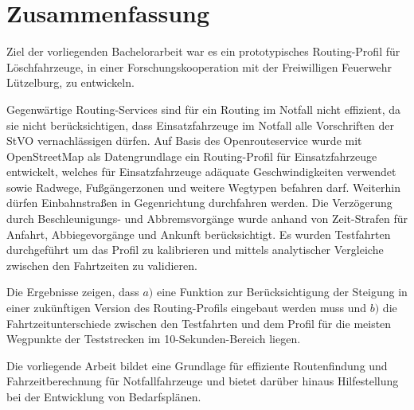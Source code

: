 {\centering\section*{Zusammenfassung}}

\vspace{1cm}

Ziel der vorliegenden Bachelorarbeit war es ein prototypisches Routing-Profil für Löschfahrzeuge, in einer Forschungskooperation mit der Freiwilligen Feuerwehr Lützelburg, zu entwickeln.
\medskip

Gegenwärtige Routing-Services sind für ein Routing im Notfall nicht effizient, da sie nicht berücksichtigen, dass Einsatzfahrzeuge im Notfall alle Vorschriften der StVO vernachlässigen dürfen.
Auf Basis des Openrouteservice wurde mit OpenStreetMap als Datengrundlage ein Routing-Profil für Einsatzfahrzeuge entwickelt, welches für Einsatzfahrzeuge adäquate Geschwindigkeiten verwendet sowie Radwege, Fußgängerzonen und weitere Wegtypen befahren darf. Weiterhin dürfen Einbahnstraßen in Gegenrichtung durchfahren werden.
Die Verzögerung durch Beschleunigungs- und Abbremsvorgänge wurde anhand von Zeit-Strafen für Anfahrt, Abbiegevorgänge und Ankunft berücksichtigt.
Es wurden Testfahrten durchgeführt um das Profil zu kalibrieren und mittels analytischer Vergleiche zwischen den Fahrtzeiten zu validieren.\par
Die Ergebnisse zeigen, dass \newline $a)$ eine Funktion zur Berücksichtigung der Steigung in einer zukünftigen Version des Routing-Profils eingebaut werden muss und \newline $b)$ die Fahrtzeitunterschiede zwischen den Testfahrten und dem Profil für die meisten Wegpunkte der Teststrecken im 10-Sekunden-Bereich liegen.
\bigskip

Die vorliegende Arbeit bildet eine Grundlage für effiziente Routenfindung und Fahrzeitberechnung für Notfallfahrzeuge und bietet darüber hinaus Hilfestellung bei der Entwicklung von Bedarfsplänen.